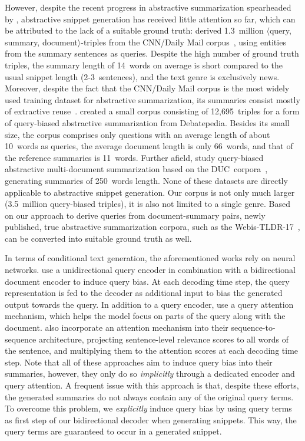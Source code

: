 \documentclass[sigconf]{acmart}
\begin{document}
However, despite the recent progress in abstractive summarization spearheaded by \citet{rush:2015}, abstractive snippet generation has received little attention so far, which can be attributed to the lack of a suitable ground truth: \citet{hasselqvist:2017} derived 1.3~million $\langle$query, summary, document$\rangle$-triples from the CNN/Daily Mail corpus~\cite{hermann:2015}, using entities from the summary sentences as queries. Despite the high number of ground truth triples, the summary length of 14~words on average is short compared to the usual snippet length (2-3~sentences), and the text genre is exclusively news. Moreover, despite the fact that the CNN/Daily Mail corpus is the most widely used training dataset for abstractive summarization, its summaries consist mostly of extractive reuse~\cite{stein:2019x}. \citet{nema:2017} created a small corpus consisting of 12,695~triples for a form of query-biased abstractive summarization from Debatepedia. Besides its small size, the corpus comprises only questions with an average length of about 10~words as queries, the average document length is only 66~words, and that of the reference summaries is 11~words. Further afield, \citet{baumel:2018} study query-biased abstractive multi-document summarization based on the DUC~corpora~\cite{dang:2005,dang:2006,dang:2007}, generating summaries of 250~words length. None of these datasets are directly applicable to abstractive snippet generation. Our corpus is not only much larger (3.5~million query-biased triples), it is also not limited to a single genre. Based on our approach to derive queries from document-summary pairs, newly published, true abstractive summarization corpora, such as the Webis-TLDR-17~\cite{stein:2018za,stein:2019x}, can be converted into suitable ground truth as well.

In terms of conditional text generation, the aforementioned works rely on neural networks. \citet{hasselqvist:2017} use a unidirectional query encoder in combination with a bidirectional document encoder to induce query bias. At each decoding time step, the query representation is fed to the decoder as additional input to bias the generated output towards the query. In addition to a query encoder, \citet{nema:2017} use a query attention mechanism, which helps the model focus on parts of the query along with the document. \citet{baumel:2018} also incorporate an attention mechanism into their sequence-to-sequence architecture, projecting sentence-level relevance scores to all words of the sentence, and multiplying them to the attention scores at each decoding time step. Note that all of these approaches aim to induce query bias into their summaries, however, they only do so {\em implicitly} through a dedicated encoder and query attention. A frequent issue with this approach is that, despite these efforts, the generated summaries do not always contain any of the original query terms. To overcome this problem, we {\em explicitly} induce query bias by using query terms as first step of our bidirectional decoder when generating snippets. This way, the query terms are guaranteed to occur in a generated snippet.
\end{document}
